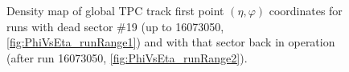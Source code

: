 \begin{figure}[h]
	\centering
	\parbox{0.4725\textwidth}{
		\centering
		\begin{subfigure}[b]{\linewidth}\centering
			\vspace{-5pt}
		\end{subfigure}
	}%
	\quad\quad%
	\parbox{0.4725\textwidth}{
		\centering
		\begin{subfigure}[b]{\linewidth}\centering
			\vspace{-5pt}
		\end{subfigure}
	}%
	\caption[Density map of global TPC track first point $(\eta,\varphi)$ coordinates for runs with/without dead sector \#19.]%
	{Density map of global TPC track first point $(\eta,\varphi)$ coordinates for runs with dead sector \#19 (up to 16073050, \ref{fig:PhiVsEta_runRange1}) and with that sector back in operation (after run 16073050, \ref{fig:PhiVsEta_runRange2}).}\label{fig:PhiVsEtaTpcSyst}%
\end{figure}

